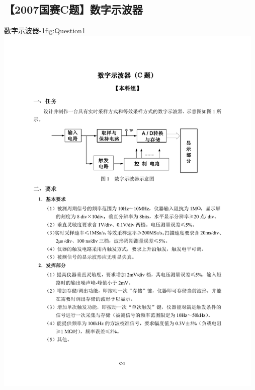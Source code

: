 \documentclass[supercite]{HustGraduPaper}
\begin{document}
	\begin{appendices}
		\section{【2007国赛C题】数字示波器}
		
		
		
		\begin{generalfig}[htb]{数字示波器-1}{fig:Question1}
			\includegraphics[width=13cm,page=1]{Docs/Question.pdf}
		\end{generalfig}
	

\end{appendices}
\end{document}
